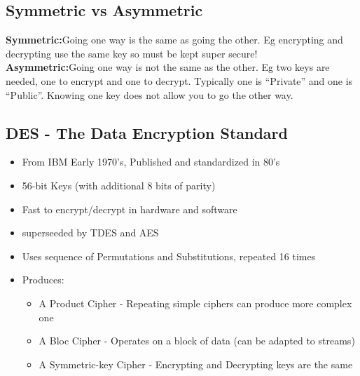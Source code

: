 \documentclass[10pt]{article}
\begin{document}
    \subsection*{Symmetric vs Asymmetric}
      \textbf{Symmetric:}Going one way is the same as going the other. Eg encrypting and decrypting use the same key so must be kept super secure!\\
      \textbf{Asymmetric:}Going one way is not the same as the other. Eg two keys are needed, one to encrypt and one to decrypt. Typically one is ``Private'' and one is ``Public''. Knowing one key does not allow you to go the other way.
    \subsection*{DES - The Data Encryption Standard}
      \begin{itemize}
        \item From IBM Early 1970's, Published and standardized in 80's
        \item 56-bit Keys (with additional 8 bits of parity)
        \item Fast to encrypt/decrypt in hardware and software
        \item superseeded by TDES and AES
        \item Uses sequence of Permutations and Substitutions, repeated 16 times
        \item Produces:
          \begin{itemize}
            \item A Product Cipher - Repeating simple ciphers can produce more complex one
            \item A Bloc Cipher - Operates on a block of data (can be adapted to streams)
            \item A Symmetric-key Cipher - Encrypting and Decrypting keys are the same
          \end{itemize}
      \end{itemize}
\end{document}
